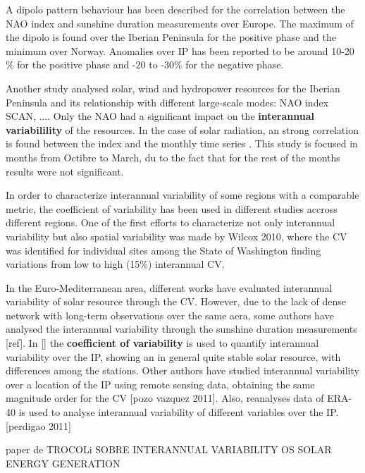 A dipolo pattern behaviour has been described for the correlation between the NAO index and sunshine duration measurements \cite*{Pozo-Vazquez2004} over Europe. The maximum of the dipolo is found over the Iberian Peninsula for the positive phase and the minimum over Norway. Anomalies over IP has been reported to be around 10-20$\%$ for the positive phase and -20 to -30$\%$ for the negative phase.

Another study analysed solar, wind and hydropower resources for the Iberian Peninsula and its relationship with different large-scale modes: NAO index SCAN, .... Only the NAO had a significant impact on the \textbf{interannual variabilility} of the resources. In the case of solar radiation, an strong correlation is found between the index and the monthly time series \cite*{Jerez2013a}. This study is focused in months from Octibre to March, du to the fact that for the rest of the months results were not significant.

In order to characterize interannual variability of some regions with a comparable metric, the coefficient of variability has been used in different studies accross different regions. One of the first efforts to characterize not only interannual variability but also spatial variability was made by Wilcox 2010, where the CV was identified for individual sites among the State of Washington finding variations from low to high (15$\%$) interannual CV.

In the Euro-Mediterranean area, different works have evaluated interannual variability of solar resource through the CV. However, due to the lack of dense network with long-term observations over the same aera, some authors have analysed the interannual variability through the sunshine duration measurements [ref]. In [] the \textbf{coefficient of variability} is used to quantify interannual variability over the IP, showing an in general quite stable solar resource, with differences among the stations. Other authors have studied interannual variability over a location of the IP using remote sensing data, obtaining the same magnitude order for the CV [pozo vazquez 2011]. Also, reanalyses data of ERA-40 is used to analyse interannual variability of different variables over the IP. [perdigao 2011]

{\color{red} paper de TROCOLi SOBRE INTERANNUAL VARIABILITY OS SOLAR ENERGY GENERATION}

